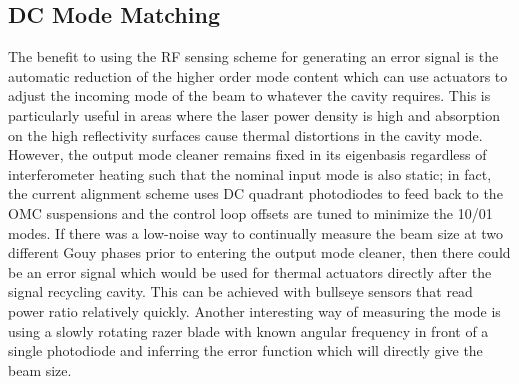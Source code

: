 		
\subsection{DC Mode Matching}
	The benefit to using the RF sensing scheme for generating an error signal is the automatic reduction of the higher order mode content which can use actuators to adjust the incoming mode of the beam to whatever the cavity requires.
	This is particularly useful in areas where the laser power density is high and absorption on the high reflectivity surfaces cause thermal distortions in the cavity mode.
	However, the output mode cleaner remains fixed in its eigenbasis regardless of interferometer heating such that the nominal input mode is also static; in fact, the current alignment scheme uses DC quadrant photodiodes to feed back to the OMC suspensions and the control loop offsets are tuned to minimize the 10/01 modes.
	If there was a low-noise way to continually measure the beam size at  two different Gouy phases prior to entering the output mode cleaner, then there could be an error signal which would be used for thermal actuators directly after the signal recycling cavity.
	This can be achieved with bullseye sensors that read power ratio relatively quickly.
	Another interesting way of measuring the mode is using a slowly rotating razer blade with known angular frequency in front of a single photodiode and inferring the error function which will directly give the beam size.
	